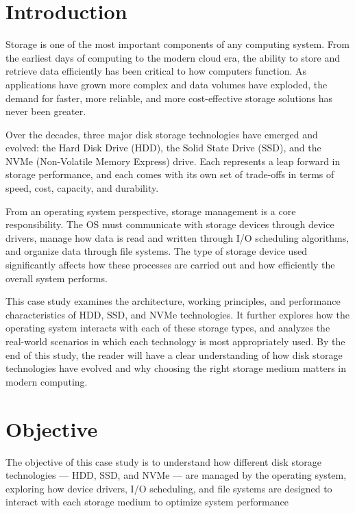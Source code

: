 \documentclass[a4paper]{article}
\begin{document}
\newpage

\newpage
\tableofcontents


\newpage
\section{Introduction}
Storage is one of the most important components of any computing system. From the earliest days of computing to the modern cloud era, 
the ability to store and retrieve data efficiently has been critical to how computers function. As applications have grown more complex 
and data volumes have exploded, the demand for faster, more reliable, and more cost-effective storage solutions has never been greater.


Over the decades, three major disk storage technologies have emerged and evolved: the Hard Disk Drive (HDD), the Solid State Drive (SSD), 
and the NVMe (Non-Volatile Memory Express) drive. Each represents a leap forward in storage performance, and each comes with its own set of 
trade-offs in terms of speed, cost, capacity, and durability.


From an operating system perspective, storage management is a core responsibility. The OS must communicate with storage devices through device 
drivers, manage how data is read and written through I/O scheduling algorithms, and organize data through file systems. The type of storage device 
used significantly affects how these processes are carried out and how efficiently the overall system performs.


This case study examines the architecture, working principles, and performance characteristics of HDD, SSD, and NVMe technologies. It further 
explores how the operating system interacts with each of these storage types, and analyzes the real-world scenarios in which each technology is most 
appropriately used. By the end of this study, the reader will have a clear understanding of how disk storage technologies have evolved and why choosing 
the right storage medium matters in modern computing.

\newpage
\section{Objective}

The objective of this case study is to understand how different disk storage technologies — HDD, SSD, and NVMe — are managed by the operating system, 
exploring how device drivers, I/O scheduling, and file systems are designed to interact with each storage medium to optimize system performance
\end{document}
